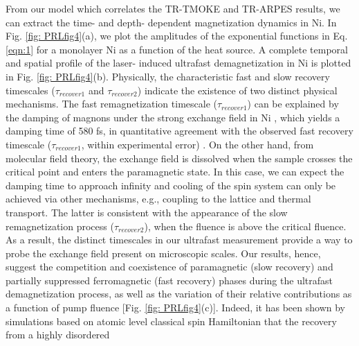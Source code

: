 From our model which correlates the TR-TMOKE and TR-ARPES results, we can extract the time- and depth- dependent magnetization dynamics in Ni. In Fig. \ref{fig: PRLfig4}(a), we plot the amplitudes of the exponential functions in Eq. \ref{eqn:1} for a monolayer Ni as a function of the heat source. A complete temporal and spatial profile of the laser- induced ultrafast demagnetization in Ni is plotted in Fig. \ref{fig: PRLfig4}(b). Physically, the characteristic fast and slow recovery timescales ($\tau_{recover1}$ and $\tau_{recover2}$) indicate the existence of two distinct physical mechanisms. The fast remagnetization timescale ($\tau_{recover1}$) can be explained by the damping of magnons under the strong exchange field in Ni \cite{Kazantseva2008}, which yields a damping time of 580 fs, in quantitative agreement with the observed fast recovery timescale ($\tau_{recover1}$, within experimental error) \cite{Tengdin2018}. On the other hand, from molecular field theory, the exchange field is dissolved when the sample crosses the critical point and enters the paramagnetic state. In this case, we can expect the damping time to approach infinity and cooling of the spin system can only be achieved via other mechanisms, e.g., coupling to the lattice and thermal transport. The latter is consistent with the appearance of the slow remagnetization process ($\tau_{recover2}$), when the fluence is above the critical fluence. As a result, the distinct timescales in our ultrafast measurement provide a way to probe the exchange field present on microscopic scales. Our results, hence, suggest the competition and coexistence of paramagnetic (slow recovery) and partially suppressed ferromagnetic (fast recovery) phases during the ultrafast demagnetization process, as well as the variation of their relative contributions as a function of pump fluence [Fig. \ref{fig: PRLfig4}(c)]. Indeed, it has been shown by simulations based on atomic level classical spin Hamiltonian that the recovery from a highly disordered
